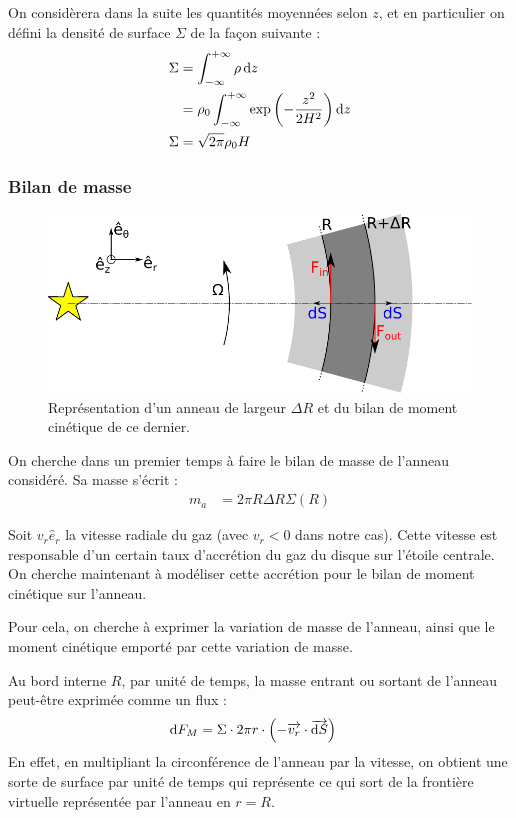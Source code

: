 On considèrera dans la suite les quantités moyennées selon $z$, et en particulier on défini la densité de surface $\Sigma$ de la façon suivante : 
\begin{align}
\Sigma &= \int_{-\infty}^{+\infty} \rho \dif z\nonumber\\
&=\rho_0 \int_{-\infty}^{+\infty}  \exp\left(-\frac{z^2}{2H^2}\right)\dif z\nonumber\\
\Sigma &= \sqrt{2\pi}\rho_0 H\label{eq:surface-to-volume}
\end{align}


\subsubsection{Bilan de masse}
\begin{figure}[htbp]
\centering
\includegraphics[width=0.7\linewidth]{figure/disk_ring.pdf}
\caption{Représentation d'un anneau de largeur $\Delta R$ et du bilan de moment cinétique de ce dernier.}\label{fig:disk_ring}
\end{figure}

On cherche dans un premier temps à faire le bilan de masse de l'anneau considéré. Sa masse s'écrit :
\begin{align}
m_a &= 2\pi R \Delta R \Sigma(R)\label{eq:m_a}
\end{align}

\bigskip

Soit $v_r\hat{e}_r$ la vitesse radiale du gaz (avec $v_r<0$ dans notre cas). Cette vitesse est responsable d'un certain taux d'accrétion du gaz du disque sur l'étoile centrale. On cherche maintenant à modéliser cette accrétion pour le bilan de moment cinétique sur l'anneau.

Pour cela, on cherche à exprimer la variation de masse de l'anneau, ainsi que le moment cinétique emporté par cette variation de masse. 

Au bord interne $R$, par unité de temps, la masse entrant ou sortant de l'anneau peut-être exprimée comme un flux :
\begin{align}
\operatorname{d \!} F_M &= \Sigma \cdot 2\pi r \cdot \left( -{\overrightarrow{v_r}} \cdot {\overrightarrow{\operatorname{d \!}S}} \right)
\end{align}
En effet, en multipliant la circonférence de l'anneau par la vitesse, on obtient une sorte de surface par unité de temps qui représente ce qui sort de la frontière virtuelle représentée par l'anneau en $r=R$. 

